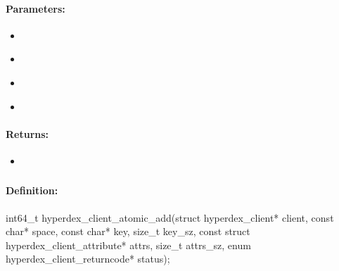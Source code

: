 \paragraph{Parameters:}
\begin{itemize}[noitemsep]
\item {}\\

\item {}\\

\item {}\\

\item {}\\

\end{itemize}

\paragraph{Returns:}
\begin{itemize}[noitemsep]
\item {}\\

\end{itemize}

\pagebreak
\subsubsection{}
\label{api:c:atomic_add}


\paragraph{Definition:}
\begin{ccode}
int64_t hyperdex_client_atomic_add(struct hyperdex_client* client,
        const char* space,
        const char* key, size_t key_sz,
        const struct hyperdex_client_attribute* attrs, size_t attrs_sz,
        enum hyperdex_client_returncode* status);
\end{ccode}

